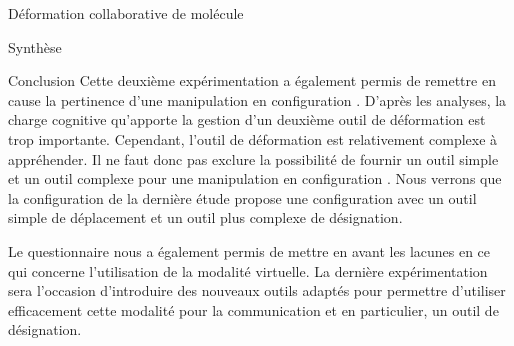 \documentclass[myfrancais]{mythesis}
\begin{document}
\begin{mychapter}{Déformation collaborative de molécule}
\begin{mysection}{Synthèse}
\begin{mysubsection}{Conclusion}
				Cette deuxième expérimentation a également permis de remettre en cause la pertinence d'une manipulation en configuration .
				D'après les analyses, la charge cognitive qu'apporte la gestion d'un deuxième outil de déformation est trop importante.
				Cependant, l'outil de déformation est relativement complexe à appréhender.
				Il ne faut donc pas exclure la possibilité de fournir un outil simple et un outil complexe pour une manipulation en configuration .
				Nous verrons que la configuration de la dernière étude  propose une configuration  avec un outil simple de déplacement et un outil plus complexe de désignation.

				Le questionnaire nous a également permis de mettre en avant les lacunes en ce qui concerne l'utilisation de la modalité virtuelle.
				La dernière expérimentation sera l'occasion d'introduire des nouveaux outils adaptés pour permettre d'utiliser efficacement cette modalité pour la communication et en particulier, un outil de désignation.
			\end{mysubsection}
		\end{mysection}
	\end{mychapter}
\end{document}
